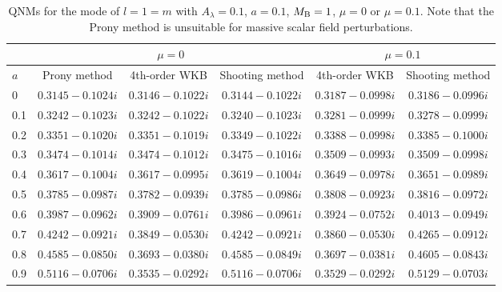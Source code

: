 \documentclass[12pt]{article}
\begin{document}
\begin{table}
\centering
\fontsize{11pt}{12pt}\selectfont
\begin{tabular}{|l|c|c|c|c|c|}
\hline
&\multicolumn{3}{|c|}{$\mu=0$}
&\multicolumn{2}{|c|}{$\mu=0.1$}
\\
\hline
$a$&Prony method &4th-order WKB&Shooting method&4th-order WKB&Shooting method\\ \hline
0&$ 0.3145-0.1024i$&$0.3146 - 0.1022 i $&$0.3144 - 0.1022 i$&$0.3187 - 0.0998 i$&$0.3186 - 0.0996 i$\\\hline
0.1&$0.3242-0.1023i$&$ 0.3242 - 0.1022 i$&$0.3240 - 0.1023 i$&$0.3281 - 0.0999 i$&$0.3278 - 0.0999 i$\\ \hline
0.2&$0.3351-0.1020i$&$0.3351 - 0.1019 i $&$0.3349 - 0.1022 i$&$0.3388 - 0.0998 i$&$0.3385 - 0.1000 i$\\\hline
0.3&$0.3474-0.1014i$&$ 0.3474 - 0.1012 i$&$ 0.3475-0.1016i$&$0.3509 - 0.0993 i $&$0.3509 - 0.0998 i$\\\hline
0.4&$0.3617-0.1004i$&$0.3617 - 0.0995 i $&$0.3619 - 0.1004 i$&$0.3649 - 0.0978 i$&$0.3651 - 0.0989 i$\\\hline
0.5&$0.3785-0.0987i$& $0.3782 - 0.0939 i$&$0.3785 - 0.0986 i$&$0.3808 - 0.0923 i$&$0.3816 - 0.0972 i$\\\hline
0.6&$0.3987-0.0962i$&$ 0.3909 - 0.0761 i$&$0.3986 - 0.0961 i$&$0.3924 - 0.0752 i$&$0.4013 - 0.0949 i$\\\hline
0.7&$0.4242-0.0921i$&$0.3849 - 0.0530 i$&$0.4242 - 0.0921 i$&$0.3860 - 0.0530 i$&$0.4265 - 0.0912 i$\\\hline
0.8&$0.4585-0.0850i$&$0.3693 - 0.0380 i$&$0.4585 - 0.0849 i$&$0.3697 - 0.0381 i$&$0.4605 - 0.0843 i$\\\hline
0.9&$0.5116-0.0706i$&$0.3535 - 0.0292 i$&$0.5116-0.0706 i$&$0.3529 - 0.0292 i$&$0.5129 - 0.0703 i$\\\hline
\end{tabular}
\caption{QNMs for the mode of $l=1=m$ with $A_\lambda=0.1$, $a=0.1$, $M_{\rm B}=1$, $\mu=0$ or $\mu=0.1$. Note that the Prony method is unsuitable for massive scalar field perturbations.}
\label{tab:QNM2}
\end{table}

\end{document}
